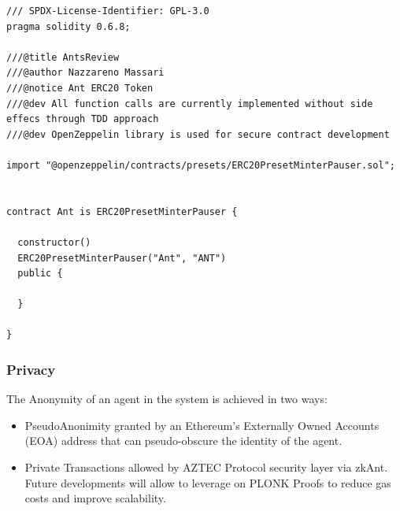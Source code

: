 \documentclass[runningheads]{llncs}
\begin{document}
{\begin{lstlisting}[language=Solidity]
/// SPDX-License-Identifier: GPL-3.0
pragma solidity 0.6.8;

///@title AntsReview
///@author Nazzareno Massari
///@notice Ant ERC20 Token
///@dev All function calls are currently implemented without side effecs through TDD approach
///@dev OpenZeppelin library is used for secure contract development

import "@openzeppelin/contracts/presets/ERC20PresetMinterPauser.sol";


contract Ant is ERC20PresetMinterPauser {

  constructor()
  ERC20PresetMinterPauser("Ant", "ANT")
  public {

  }

}
\end{lstlisting}


\subsubsection{Privacy}

The Anonymity of an agent in the system is achieved in two ways:

\begin{itemize}
  \item PseudoAnonimity granted by an Ethereum's Externally Owned Accounts (EOA) address that can pseudo-obscure the identity of the agent.
  \item Private Transactions allowed by AZTEC Protocol security layer via zkAnt. Future developments will allow to leverage on PLONK Proofs to reduce gas costs and improve scalability.
\end{itemize}

}
\end{document}
